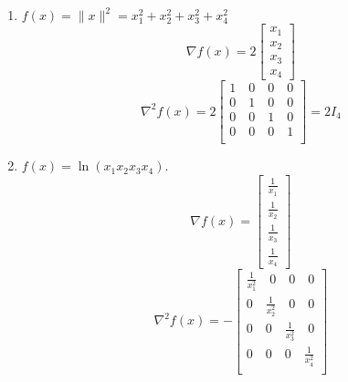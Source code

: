 \documentclass[11pt]{amsart}
\begin{document}
\begin{enumerate}
\begin{enumerate}
\item $f(x) = \|x\|^2 = x_1^2 + x_2^2 + x_3^2 + x_4^2$\\
\[
\nabla f(x) = 2
\begin{bmatrix}
    x_1 \\ x_2 \\ x_3 \\ x_4
\end{bmatrix}
\]
\[
\nabla^2 f(x) = 2
\begin{bmatrix}
    1\quad 0\quad 0\quad 0 \\
    0\quad 1\quad 0\quad 0 \\
    0\quad 0\quad 1\quad 0 \\
    0\quad 0\quad 0\quad 1 \\
\end{bmatrix}
=2I_4
\] 

\item $f(x) = \ln(x_1x_2x_3x_4)$.  
\[
\nabla f(x) = 
\begin{bmatrix}
    \frac{1}{x_1} \\
    \frac{1}{x_2} \\
    \frac{1}{x_3} \\
    \frac{1}{x_4} 
\end{bmatrix}
\]
\[
\nabla^2 f(x) = -
\begin{bmatrix}
    \frac{1}{x_1^2}\quad 0\quad 0\quad 0 \\
    0\quad \frac{1}{x_2^2}\quad 0\quad 0 \\
    0\quad 0\quad \frac{1}{x_3^2}\quad 0 \\ 
    0\quad 0\quad 0\quad \frac{1}{x_4^2} \\
\end{bmatrix}
\]
\end{enumerate}

\newpage


\end{enumerate}
\end{document}
